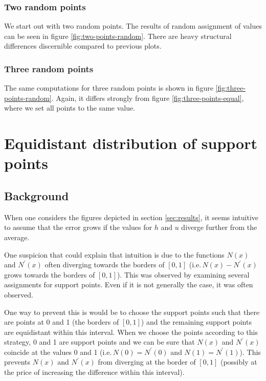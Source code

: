 \documentclass[a4paper, twoside]{article}
\begin{document}
\subsubsection{Two random points}
\label{sec:two-random-points}

We start out with two random points. The results of random assignment of values can be seen in figure \ref{fig:two-points-random}. There are heavy structural differences discernible compared to previous plots.



\subsubsection{Three random points}
\label{sec:three-random-points}

The same computations for three random points is shown in figure \ref{fig:three-points-random}. Again, it differs strongly from figure \ref{fig:three-points-equal}, where we set all points to the same value.



\section{Equidistant distribution of support points}
\label{sec:equidistant-distribution-of-support-points}

\subsection{Background}
\label{sec:equidistant-support-points-background}

When one considers the figures depicted in section \ref{sec:results}, it seems intuitive to assume that the error grows if the values for $h$ and $u$ diverge further from the average.

One suspicion that could explain that intuition is due to the functions $N\left(x\right)$ and $N^\prime\left(x\right)$ often diverging towards the borders of $[0,1]$ (i.e.\,$N(x)-N^\prime(x)$ grows towards the borders of $[0,1]$). This was observed by examining several assignments for support points. Even if it is not generally the case, it was often observed.

One way to prevent this is would be to choose the support points such that there are points at 0 and 1 (the borders of $[0,1]$) and the remaining support points are equidistant within this interval. When we choose the points according to this strategy, 0 and 1 are support points and we can be sure that $N\left(x\right)$ and $N^\prime\left(x\right)$ coincide at the values 0 and 1 (i.e.\,$N\left(0\right)=N^\prime\left(0\right)$ and $N\left(1\right)=N^\prime\left(1\right)$). This prevents $N(x)$ and $N^\prime(x)$ from diverging at the border of $[0,1]$ (possibly at the price of increasing the difference within this interval).
\end{document}
